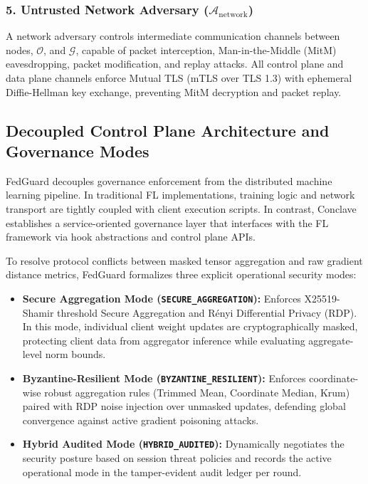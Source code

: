 \subsubsection{5. Untrusted Network Adversary ($\mathcal{A}_{\text{network}}$)}
A network adversary controls intermediate communication channels between nodes, $\mathcal{O}$, and $\mathcal{G}$, capable of packet interception, Man-in-the-Middle (MitM) eavesdropping, packet modification, and replay attacks. All control plane and data plane channels enforce Mutual TLS (mTLS over TLS 1.3) with ephemeral Diffie-Hellman key exchange, preventing MitM decryption and packet replay.

\subsection{Decoupled Control Plane Architecture and Governance Modes}

FedGuard decouples governance enforcement from the distributed machine learning pipeline. In traditional FL implementations, training logic and network transport are tightly coupled with client execution scripts. In contrast, Conclave establishes a service-oriented governance layer that interfaces with the FL framework via hook abstractions and control plane APIs.

To resolve protocol conflicts between masked tensor aggregation and raw gradient distance metrics, FedGuard formalizes three explicit operational security modes:
\begin{itemize}
    \item \textbf{Secure Aggregation Mode (\texttt{SECURE\_AGGREGATION}):} Enforces X25519-Shamir threshold Secure Aggregation and Rényi Differential Privacy (RDP). In this mode, individual client weight updates are cryptographically masked, protecting client data from aggregator inference while evaluating aggregate-level norm bounds.
    \item \textbf{Byzantine-Resilient Mode (\texttt{BYZANTINE\_RESILIENT}):} Enforces coordinate-wise robust aggregation rules (Trimmed Mean, Coordinate Median, Krum) paired with RDP noise injection over unmasked updates, defending global convergence against active gradient poisoning attacks.
    \item \textbf{Hybrid Audited Mode (\texttt{HYBRID\_AUDITED}):} Dynamically negotiates the security posture based on session threat policies and records the active operational mode in the tamper-evident audit ledger per round.
\end{itemize}

